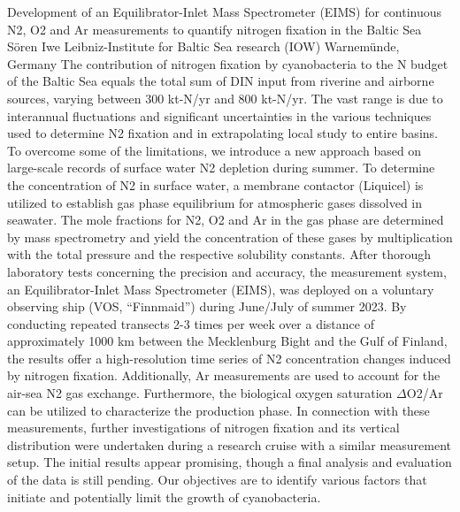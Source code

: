 \begin{conf-abstract}
{Development of an Equilibrator-Inlet Mass Spectrometer (EIMS) for continuous N2, O2 and Ar measurements to quantify nitrogen fixation in the Baltic Sea}
{Sören Iwe}
{Leibniz-Institute for Baltic Sea research (IOW) Warnemünde, Germany}
{The contribution of nitrogen fixation by cyanobacteria to the N budget of the Baltic Sea equals the total sum of DIN input from riverine and airborne sources, varying between 300 kt-N/yr and 800 kt-N/yr. The vast range is due to interannual fluctuations and significant uncertainties in the various techniques used to determine N2 fixation and in extrapolating local study to entire basins. To overcome some of the limitations, we introduce a new approach based on large-scale records of surface water N2 depletion during summer. 
To determine the concentration of N2 in surface water, a membrane contactor (Liquicel) is utilized to establish gas phase equilibrium for atmospheric gases dissolved in seawater. The mole fractions for N2, O2 and Ar in the gas phase are determined by mass spectrometry and yield the concentration of these gases by multiplication with the total pressure and the respective solubility constants. 
After thorough laboratory tests concerning the precision and accuracy, the measurement system, an Equilibrator-Inlet Mass Spectrometer (EIMS), was deployed on a voluntary observing ship (VOS, “Finnmaid”) during June/July of summer 2023. By conducting repeated transects 2-3 times per week over a distance of approximately 1000 km between the Mecklenburg Bight and the Gulf of Finland, the results offer a high-resolution time series of N2 concentration changes induced by nitrogen fixation. Additionally, Ar measurements are used to account for the air-sea N2 gas exchange. Furthermore, the biological oxygen saturation $\Delta$O2/Ar can be utilized to characterize the production phase. 
In connection with these measurements, further investigations of nitrogen fixation and its vertical distribution were undertaken during a research cruise with a similar measurement setup.
The initial results appear promising, though a final analysis and evaluation of the data is still pending. Our objectives are to identify various factors that initiate and potentially limit the growth of cyanobacteria.}
\end{conf-abstract}
